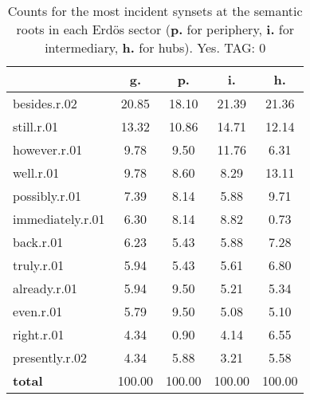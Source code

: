 \begin{table}[h!]
\begin{center}
\begin{tabular}{| l | c | c | c | c |}\hline
 & g. & p. & i. & h. \\\hline
besides.r.02 & 20.85  & 18.10  & 21.39  & 21.36 \\\hline
still.r.01 & 13.32  & 10.86  & 14.71  & 12.14 \\\hline
however.r.01 & 9.78  & 9.50  & 11.76  & 6.31 \\\hline
well.r.01 & 9.78  & 8.60  & 8.29  & 13.11 \\\hline
possibly.r.01 & 7.39  & 8.14  & 5.88  & 9.71 \\\hline
immediately.r.01 & 6.30  & 8.14  & 8.82  & 0.73 \\\hline
back.r.01 & 6.23  & 5.43  & 5.88  & 7.28 \\\hline
truly.r.01 & 5.94  & 5.43  & 5.61  & 6.80 \\\hline
already.r.01 & 5.94  & 9.50  & 5.21  & 5.34 \\\hline
even.r.01 & 5.79  & 9.50  & 5.08  & 5.10 \\\hline
right.r.01 & 4.34  & 0.90  & 4.14  & 6.55 \\\hline
presently.r.02 & 4.34  & 5.88  & 3.21  & 5.58 \\\hline
{{\bf total}} & 100.00  & 100.00  & 100.00  & 100.00 \\\hline
\end{tabular}
\caption{Counts for the most incident synsets at the semantic roots in each Erd\"os sector ({\bf p.} for periphery, {\bf i.} for intermediary, {\bf h.} for hubs). Yes. TAG: 0}
\end{center}
\end{table}